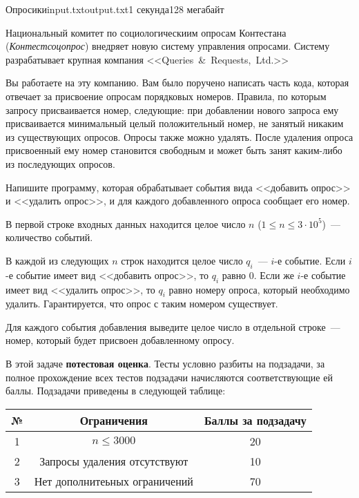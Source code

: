 \begin{problem}{Опросики}{input.txt}{output.txt}{1 секунда}{128 мегабайт}

Национальный комитет по социологическиим опросам Контестана (\textit{Контестсоцопрос}) внедряет новую систему управления опросами. Систему разрабатывает крупная компания <<Queries~\&~Requests,~Ltd.>>

Вы работаете на эту компанию. Вам было поручено написать часть кода, которая отвечает за присвоение опросам порядковых номеров. Правила, по которым запросу присваивается номер, следующие: при добавлении нового запроса ему присваивается минимальный целый положительный номер, не занятый никаким из существующих опросов. Опросы также можно удалять. После удаления опроса присвоенный ему номер становится свободным и может быть занят каким-либо из последующих опросов.

Напишите программу, которая обрабатывает события вида <<добавить опрос>> и <<удалить опрос>>, и для каждого добавленного опроса сообщает его номер.

\InputFile

В первой строке входных данных находится целое число $n$ ($1 \le n \le 3\cdot 10^5$)~--- количество событий.

В каждой из следующих $n$ строк находится целое число $q_i$~--- $i$-е событие. Если $i$-е событие имеет вид <<добавить опрос>>, то $q_i$ равно $0$. Если же $i$-е событие имеет вид <<удалить опрос>>, то $q_i$ равно номеру опроса, который необходимо удалить. Гарантируется, что опрос с таким номером существует.

\OutputFile

Для каждого события добавления выведите целое число в отдельной строке~--- номер, который будет присвоен добавленному опросу.

\Examples

\begin{example}
%
\end{example}

\Scoring

В этой задаче \textbf{потестовая оценка}. Тесты условно разбиты на подзадачи, за полное прохождение всех тестов подзадачи начисляются соответствующие ей баллы. Подзадачи приведены в следующей таблице:

\medskip

\begin{tabular}{| c | c | c |} \hline
	№ & Ограничения & Баллы за подзадачу \\ \hline
	1 & $n \le 3000$ & 20 \\ \hline
	2 & Запросы удаления отсутствуют & 10 \\ \hline
	3 & Нет дополнитеьных ограничений & 70 \\ \hline
\end{tabular}

\end{problem}

